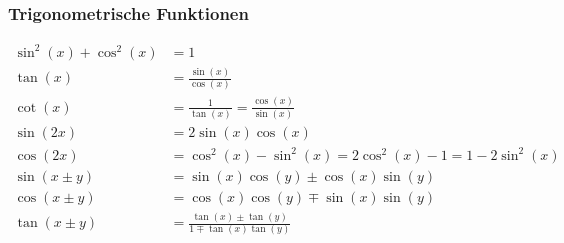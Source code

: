 \subsubsection{Trigonometrische Funktionen}
\begin{equation*}
    \begin{split}
        \sin^2(x)+\cos^2(x) &= 1\\
        \tan(x) &= \frac{\sin(x)}{\cos(x)}\\
        \cot(x) &= \frac{1}{\tan(x)} = \frac{\cos(x)}{\sin(x)}\\
        \sin(2x) &= 2\sin(x)\cos(x)\\
        \cos(2x) &= \cos^2(x)-\sin^2(x) = 2\cos^2(x)-1 = 1-2\sin^2(x)\\
        \sin(x\pm y) &= \sin(x)\cos(y)\pm\cos(x)\sin(y)\\
        \cos(x\pm y) &= \cos(x)\cos(y)\mp\sin(x)\sin(y)\\
        \tan(x\pm y) &= \frac{\tan(x)\pm\tan(y)}{1\mp\tan(x)\tan(y)}
    \end{split}
\end{equation*}
